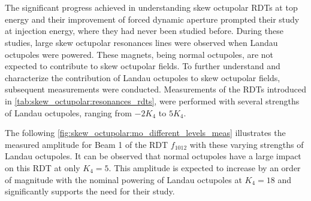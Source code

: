 \FloatBarrier
\section{}



The significant progress achieved in understanding skew octupolar RDTs at top energy and their
improvement of forced dynamic aperture prompted their study at injection energy, where they had
never been studied before. During these studies, large skew octupolar resonances lines were observed
when Landau octupoles were powered. These magnets, being normal octupoles, are not expected to
contribute to skew octupolar fields. To further understand and characterize the contribution of
Landau octupoles to skew octupolar fields, subsequent measurements were conducted. Measurements of
the RDTs introduced in \cref{tab:skew_octupolar:resonances_rdts}, were performed with several
strengths of Landau octupoles, ranging from $-2 K_4$ to $5 K_4$.

The following \cref{fig:skew_octupolar:mo_different_levels_meas} illustrates the measured amplitude
for Beam 1 of the RDT $f_{1012}$ with these varying strengths of Landau octupoles. It can be
observed that normal octupoles have a large impact on this RDT at only $K_4 = 5$. This amplitude is
expected to increase by an order of magnitude with the nominal powering of Landau octupoles at
$K_4 = 18$ and significantly supports the need for their study.


